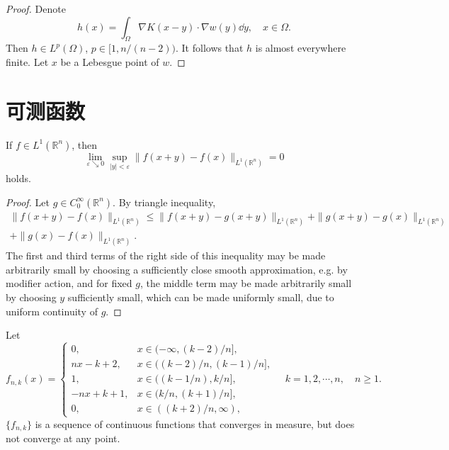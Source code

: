 \begin{proof}
  Denote 
  \[
  h(x) = \int_\Omega \nabla K(x-y) \cdot\nabla w(y)\dd y,\quad x\in\Omega.
  \]
  Then $h\in L^{p}(\Omega)$, $p\in[1,n/(n-2))$.
  It follows that $h$ is almost everywhere finite.
  Let $x$ be a Lebesgue point of $w$.
\end{proof}

\section{可测函数}

\begin{proposition}\label{prop: uniform continuity of integrable function}
  If $f\in L^1(\mathbb R^n)$, then 
  \[
  \lim_{\varepsilon\searrow0}\sup_{|y|<\varepsilon}\|f(x+y)-f(x)\|_{L^1(\mathbb R^n)} = 0
  \]
  holds.
\end{proposition}

\begin{proof}
  Let $g\in C^\infty_0(\mathbb R^n)$. 
  By triangle inequality,
  \begin{align*}
		\|f(x+y)-f(x)\|_{L^1(\mathbb R^n)} 
		\leq \|f(x+y)-g(x+y)\|_{L^1(\mathbb R^n)} 
		+ \|g(x+y)-g(x)\|_{L^1(\mathbb R^n)}\\
		+ \|g(x)-f(x)\|_{L^1(\mathbb R^n)}.
	\end{align*}
  The first and third terms of the right side of this inequality may be made arbitrarily small 
  by choosing a sufficiently close smooth approximation, e.g. by modifier action, 
  and for fixed $g$, the middle term may be made arbitrarily small by choosing $y$ sufficiently small,
  which can be made uniformly small, due to uniform continuity of $g$.
\end{proof}

\begin{example}
  Let 
  \begin{equation}
    f_{n,k}(x) = 
    \begin{cases}
      0, & x\in(-\infty, (k-2)/n],\\
      nx-k+2,& x\in((k-2)/n, (k-1)/n],\\
      1,& x\in((k-1/n), k/n],\\
      -nx+k+1, & x\in(k/n, (k+1)/n],\\
      0, & x\in((k+2)/n, \infty),
    \end{cases}
    \quad k = 1,2,\cdots,n, \quad n\geq1.
  \end{equation}
  $\{f_{n,k}\}$ is a sequence of continuous functions that converges in measure, 
  but does not converge at any point.
\end{example}

